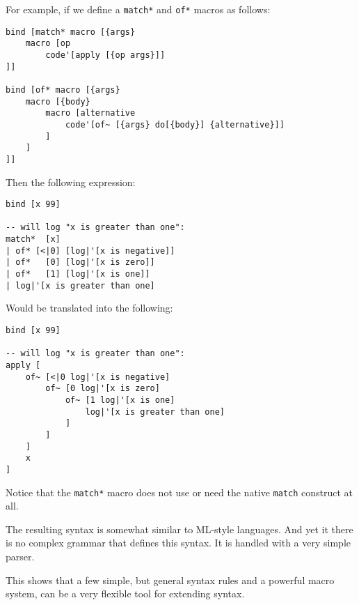 For example, if we define a \texttt{match*} and \texttt{of*} macros as follows:
\begin{lstlisting}
bind [match* macro [{args}
	macro [op
		code'[apply [{op args}]]
]]

bind [of* macro [{args}
    macro [{body}
        macro [alternative
            code'[of~ [{args} do[{body}] {alternative}]]
        ]
    ]
]]
\end{lstlisting}

Then the following expression:
\begin{lstlisting}
bind [x 99]

-- will log "x is greater than one":
match*  [x]
| of* [<|0] [log|'[x is negative]]
| of*   [0] [log|'[x is zero]]
| of*   [1] [log|'[x is one]]
| log|'[x is greater than one]
\end{lstlisting}

Would be translated into the following:
\begin{lstlisting}
bind [x 99]

-- will log "x is greater than one":
apply [
    of~ [<|0 log|'[x is negative]
        of~ [0 log|'[x is zero]
            of~ [1 log|'[x is one]
                log|'[x is greater than one]
            ]
        ]
    ]
    x
]
\end{lstlisting}

Notice that the \texttt{match*} macro does not use or need the native \texttt{match} construct at all.

The resulting syntax is somewhat similar to ML-style\cite[Section~Algebraic datatypes and pattern matching]{standard_ml_wikipedia} languages. And yet it there is no complex grammar that defines this syntax. It is handled with a very simple parser.

This shows that a few simple, but general syntax rules and a powerful macro system, can be a very flexible tool for extending syntax.

